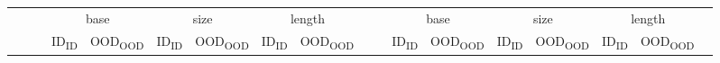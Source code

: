 \documentclass{article}
\begin{document}
\begin{table}[ht]
{\begin{tabular}{lllccccccccccccccc}
    & & & \multicolumn{2}{c}{base} & \multicolumn{2}{c}{size} & \multicolumn{2}{c}{length} & & & \multicolumn{2}{c}{base} & \multicolumn{2}{c}{size} & \multicolumn{2}{c}{length} &\\
    \cmidrule(r){4-5} \cmidrule(r){6-7} \cmidrule(r){8-9} \cmidrule(r){12-13}\cmidrule(r){14-15}\cmidrule(r){16-17}
    & & & \multicolumn{1}{c}{ID\textsubscript{ID}} & \multicolumn{1}{c}{OOD\textsubscript{OOD}} & \multicolumn{1}{c}{ID\textsubscript{ID}} & \multicolumn{1}{c}{OOD\textsubscript{OOD}} & \multicolumn{1}{c}{ID\textsubscript{ID}} & \multicolumn{1}{c}{OOD\textsubscript{OOD}} & & & \multicolumn{1}{c}{ID\textsubscript{ID}} & \multicolumn{1}{c}{OOD\textsubscript{OOD}} & \multicolumn{1}{c}{ID\textsubscript{ID}} & \multicolumn{1}{c}{OOD\textsubscript{OOD}} & \multicolumn{1}{c}{ID\textsubscript{ID}} & \multicolumn{1}{c}{OOD\textsubscript{OOD}} &\\
    \cmidrule(r){1-9} \cmidrule(r){11-17}
    

\end{tabular}}
\end{table}
\end{document}
